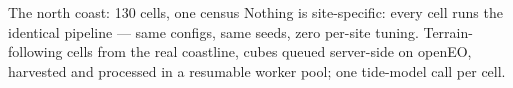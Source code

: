 \begin{pblock}{The north coast: 130 cells, one census}
Nothing is site-specific: every cell runs the identical pipeline — same
configs, same seeds, zero per-site tuning. Terrain-following cells from the
real coastline, cubes queued server-side on openEO, harvested and processed
in a resumable worker pool; one tide-model call per cell.

\vspace{2mm}
\end{pblock}
